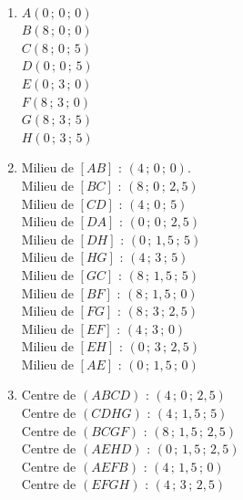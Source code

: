 \begin{corrige}
\ \\ \vspace*{-9mm}
   \begin{multicols}{3}
   \begin{enumerate}
      \item {\blue
         $A(0\,;\,0\,;\,0)$ \\
         $B(8\,;\,0\,;\,0)$ \\
         $C(8\,;\,0\,;\,5)$ \\
         $D(0\,;\,0\,;\,5)$ \\
         $E(0\,;\,3\,;\,0)$ \\
         $F(8\,;\,3\,;\,0)$ \\
         $G(8\,;\,3\,;\,5)$ \\
         $H(0\,;\,3\,;\,5)$}
         \columnbreak
      \item  {\blue
         Milieu de $[AB]$ : $(4\,;\,0\,;\,0)$.\\
         Milieu de $[BC]$ : $(8\,;\,0\,;\,2,5)$ \\
         Milieu de $[CD]$ : $(4\,;\,0\,;\,5)$ \\
         Milieu de $[DA]$ : $(0\,;\,0\,;\,2,5)$ \\
         Milieu de $[DH]$ : $(0\,;\,1,5\,;\,5)$ \\
         Milieu de $[HG]$ : $(4\,;\,3\,;\,5)$ \\
         Milieu de $[GC]$ : $(8\,;\,1,5\,;\,5)$ \\
         Milieu de $[BF]$ : $(8\,;\,1,5\,;\,0)$ \\
         Milieu de $[FG]$ : $(8\,;\,3\,;\,2,5)$ \\
         Milieu de $[EF]$ : $(4\,;\,3\,;\,0)$ \\
         Milieu de $[EH]$ : $(0\,;\,3\,;\,2,5)$ \\
         Milieu de $[AE]$ : $(0\,;\,1,5\,;\,0)$}
         \columnbreak
      \item  {\blue
         Centre de $(ABCD)$ : $(4\,;\,0\,;\,2,5)$ \\
         Centre de $(CDHG)$ : $(4\,;\,1,5\,;\,5)$ \\
         Centre de $(BCGF)$ : $(8\,;\,1,5\,;\,2,5)$ \\
         Centre de $(AEHD)$ : $(0\,;\,1,5\,;\,2,5)$ \\
         Centre de $(AEFB)$ : $(4\,;\,1,5\,;\,0)$ \\
         Centre de $(EFGH)$ : $(4\,;\,3\,;\,2,5)$}
      \end{enumerate}
   \end{multicols}
\end{corrige}

